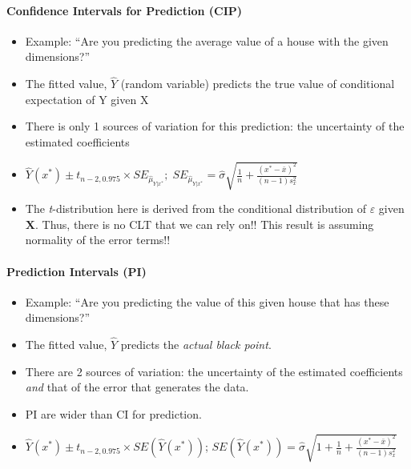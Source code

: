 \documentclass[]{article}
\providecommand{\tightlist}{%
  \setlength{\itemsep}{0pt}\setlength{\parskip}{0pt}}
\let\oldparagraph\paragraph
\renewcommand{\paragraph}[1]{\oldparagraph{#1}\mbox{}}
\begin{document}
\hypertarget{confidence-intervals-for-prediction-cip}{%
\paragraph{Confidence Intervals for Prediction
(CIP)}\label{confidence-intervals-for-prediction-cip}}

\begin{itemize}
\tightlist
\item
  Example: ``Are you predicting the average value of a house with the
  given dimensions?''
\item
  The fitted value, \(\hat{Y}\) (random variable) predicts the true
  value of conditional expectation of Y given X\\
\item
  There is only 1 sources of variation for this prediction: the
  uncertainty of the estimated coefficients\\
\item
  \(\hat{Y}(x^*) \pm t_{n-2,0.975} \times SE_{\hat{\mu}_{Y|x^*}}; \; SE_{\hat{\mu}_{Y|x^*}}=\hat{\sigma} \sqrt{\frac{1}{n}+\frac{(x^*-\bar{x})^2}{(n-1)s_x^2}}\)
\item
  The \emph{t}-distribution here is derived from the conditional
  distribution of \(\varepsilon\) given \(\mathbf{X}\). Thus, there is
  no CLT that we can rely on!! This result is assuming normality of the
  error terms!!
\end{itemize}

\hypertarget{prediction-intervals-pi}{%
\paragraph{Prediction Intervals (PI)}\label{prediction-intervals-pi}}

\begin{itemize}
\tightlist
\item
  Example: ``Are you predicting the value of this given house that has
  these dimensions?''
\item
  The fitted value, \(\hat{Y}\) predicts the \emph{actual black
  point}.\\
\item
  There are 2 sources of variation: the uncertainty of the estimated
  coefficients \emph{and} that of the error that generates the data.\\
\item
  PI are wider than CI for prediction.\\
\item
  \(\hat{Y}(x^*) \pm t_{n-2,0.975} \times SE(\hat{Y}(x^*))\);
  \(SE(\hat{Y}(x^*))=\hat{\sigma} \sqrt{1+\frac{1}{n}+\frac{(x^*-\bar{x})^2}{(n-1)s_x^2}}\)
\end{itemize}
\end{document}
